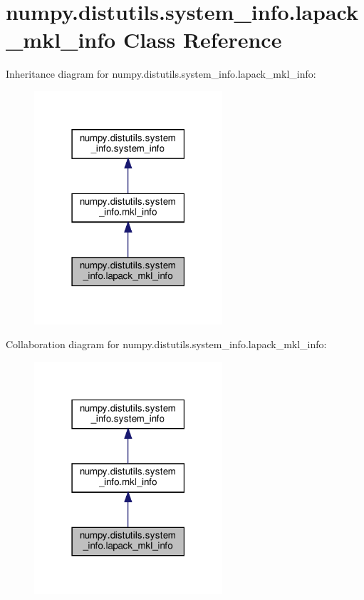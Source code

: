 \hypertarget{classnumpy_1_1distutils_1_1system__info_1_1lapack__mkl__info}{}\section{numpy.\+distutils.\+system\+\_\+info.\+lapack\+\_\+mkl\+\_\+info Class Reference}
\label{classnumpy_1_1distutils_1_1system__info_1_1lapack__mkl__info}


Inheritance diagram for numpy.\+distutils.\+system\+\_\+info.\+lapack\+\_\+mkl\+\_\+info\+:
\nopagebreak
\begin{figure}[H]
\begin{center}
\leavevmode
\includegraphics[width=198pt]{classnumpy_1_1distutils_1_1system__info_1_1lapack__mkl__info__inherit__graph}
\end{center}
\end{figure}


Collaboration diagram for numpy.\+distutils.\+system\+\_\+info.\+lapack\+\_\+mkl\+\_\+info\+:
\nopagebreak
\begin{figure}[H]
\begin{center}
\leavevmode
\includegraphics[width=198pt]{classnumpy_1_1distutils_1_1system__info_1_1lapack__mkl__info__coll__graph}
\end{center}
\end{figure}

